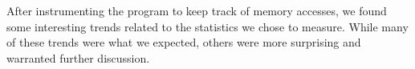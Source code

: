After instrumenting the program to keep track of memory accesses, we found some interesting trends related to the statistics we chose to measure. While many of these trends were what we expected, others were more surprising and warranted further discussion.
